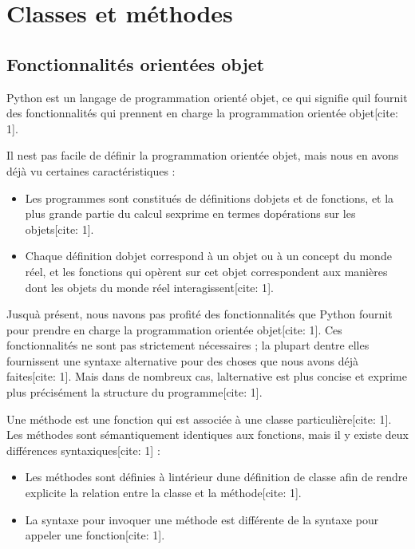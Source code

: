 \hypertarget{classes-et-muxe9thodes}{%
\section{Classes et méthodes}\label{classes-et-muxe9thodes}}

\hypertarget{fonctionnalituxe9s-orientuxe9es-objet}{%
\subsection{Fonctionnalités orientées
objet}\label{fonctionnalituxe9s-orientuxe9es-objet}}

Python est un langage de programmation orienté objet, ce qui signifie
qu\textquotesingle il fournit des fonctionnalités qui prennent en charge
la programmation orientée objet{[}cite: 1{]}.

Il n\textquotesingle est pas facile de définir la programmation orientée
objet, mais nous en avons déjà vu certaines caractéristiques :

\begin{itemize}
\tightlist
\item
  Les programmes sont constitués de définitions d\textquotesingle objets
  et de fonctions, et la plus grande partie du calcul
  s\textquotesingle exprime en termes d\textquotesingle opérations sur
  les objets{[}cite: 1{]}.
\item
  Chaque définition d\textquotesingle objet correspond à un objet ou à
  un concept du monde réel, et les fonctions qui opèrent sur cet objet
  correspondent aux manières dont les objets du monde réel
  interagissent{[}cite: 1{]}.
\end{itemize}

Jusqu\textquotesingle à présent, nous n\textquotesingle avons pas
profité des fonctionnalités que Python fournit pour prendre en charge la
programmation orientée objet{[}cite: 1{]}. Ces fonctionnalités ne sont
pas strictement nécessaires ; la plupart d\textquotesingle entre elles
fournissent une syntaxe alternative pour des choses que nous avons déjà
faites{[}cite: 1{]}. Mais dans de nombreux cas,
l\textquotesingle alternative est plus concise et exprime plus
précisément la structure du programme{[}cite: 1{]}.

Une méthode est une fonction qui est associée à une classe
particulière{[}cite: 1{]}. Les méthodes sont sémantiquement identiques
aux fonctions, mais il y existe deux différences syntaxiques{[}cite:
1{]} :

\begin{itemize}
\tightlist
\item
  Les méthodes sont définies à l\textquotesingle intérieur
  d\textquotesingle une définition de classe afin de rendre explicite la
  relation entre la classe et la méthode{[}cite: 1{]}.
\item
  La syntaxe pour invoquer une méthode est différente de la syntaxe pour
  appeler une fonction{[}cite: 1{]}.
\end{itemize}

